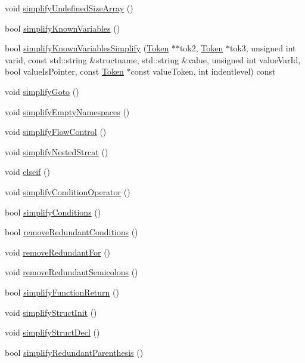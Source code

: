 \begin{DoxyCompactItemize}
void \hyperlink{class_tokenizer_a332c62eb5d90825b802a93f9f6613c1b}{simplify\-Undefined\-Size\-Array} ()
\item 
bool \hyperlink{class_tokenizer_ae1824db120475c5d75b742e7eac9276a}{simplify\-Known\-Variables} ()
\item 
bool \hyperlink{class_tokenizer_a0dec37477d6c4639c79a961b72abc77b}{simplify\-Known\-Variables\-Simplify} (\hyperlink{class_token}{Token} $\ast$$\ast$tok2, \hyperlink{class_token}{Token} $\ast$tok3, unsigned int varid, const std\-::string \&structname, std\-::string \&value, unsigned int value\-Var\-Id, bool value\-Is\-Pointer, const \hyperlink{class_token}{Token} $\ast$const value\-Token, int indentlevel) const 
\item 
void \hyperlink{class_tokenizer_a252abfdedbd97a53a8b857420d12654a}{simplify\-Goto} ()
\item 
void \hyperlink{class_tokenizer_a7034fc3dabd74b2a01aedaa74e19f426}{simplify\-Empty\-Namespaces} ()
\item 
void \hyperlink{class_tokenizer_a9b5cd11dd4c20365f8fe31b19dbcfc69}{simplify\-Flow\-Control} ()
\item 
void \hyperlink{class_tokenizer_a542ae86b25bd3cfb96b51b976a585f41}{simplify\-Nested\-Strcat} ()
\item 
void \hyperlink{class_tokenizer_a1bf74b4b204cea528eb98708a322e761}{elseif} ()
\item 
void \hyperlink{class_tokenizer_afb20e62fe8f0fe22b9e9f5c46c9a944b}{simplify\-Condition\-Operator} ()
\item 
bool \hyperlink{class_tokenizer_ae6363314ad4f9691219a771eb14bf93f}{simplify\-Conditions} ()
\item 
bool \hyperlink{class_tokenizer_a0f79b2b8532b9910e5fe23b8af24ad0f}{remove\-Redundant\-Conditions} ()
\item 
void \hyperlink{class_tokenizer_a6073b131f653c1e89c01e52b03bba3b5}{remove\-Redundant\-For} ()
\item 
void \hyperlink{class_tokenizer_ac585e6704bc6b95bce3318d4bbf36c42}{remove\-Redundant\-Semicolons} ()
\item 
bool \hyperlink{class_tokenizer_a7875cbb8e96e341f496e0c14eff4e846}{simplify\-Function\-Return} ()
\item 
void \hyperlink{class_tokenizer_ac86781416900a72ce34cf6644706191d}{simplify\-Struct\-Init} ()
\item 
void \hyperlink{class_tokenizer_ade9c95a7840d26978ec30a216744d137}{simplify\-Struct\-Decl} ()
\item 
bool \hyperlink{class_tokenizer_a8fd90f320882f33351e6939ae175648d}{simplify\-Redundant\-Parenthesis} ()
$$
\end{DoxyCompactItemize}
